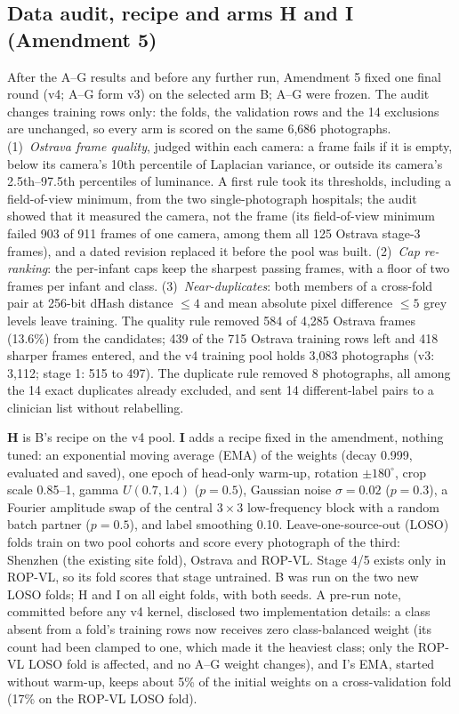 \documentclass[conference]{IEEEtran}
\begin{document}
\subsection{Data audit, recipe and arms H and I (Amendment 5)}
After the A--G results and before any further run, Amendment 5 fixed one final round (v4; A--G form v3) on the selected arm B; A--G were frozen. The audit changes training rows only: the folds, the validation rows and the 14 exclusions are unchanged, so every arm is scored on the same 6{,}686 photographs. (1)~\emph{Ostrava frame quality}, judged within each camera: a frame fails if it is empty, below its camera's 10th percentile of Laplacian variance, or outside its camera's 2.5th--97.5th percentiles of luminance. A first rule took its thresholds, including a field-of-view minimum, from the two single-photograph hospitals; the audit showed that it measured the camera, not the frame (its field-of-view minimum failed 903 of 911 frames of one camera, among them all 125 Ostrava stage-3 frames), and a dated revision replaced it before the pool was built. (2)~\emph{Cap re-ranking}: the per-infant caps keep the sharpest passing frames, with a floor of two frames per infant and class. (3)~\emph{Near-duplicates}: both members of a cross-fold pair at 256-bit dHash distance $\le4$ and mean absolute pixel difference $\le5$ grey levels leave training. The quality rule removed 584 of 4{,}285 Ostrava frames (13.6\%) from the candidates; 439 of the 715 Ostrava training rows left and 418 sharper frames entered, and the v4 training pool holds 3{,}083 photographs (v3: 3{,}112; stage 1: 515 to 497). The duplicate rule removed 8 photographs, all among the 14 exact duplicates already excluded, and sent 14 different-label pairs to a clinician list without relabelling.

\textbf{H} is B's recipe on the v4 pool. \textbf{I} adds a recipe fixed in the amendment, nothing tuned: an exponential moving average (EMA) of the weights (decay 0.999, evaluated and saved), one epoch of head-only warm-up, rotation $\pm180^\circ$, crop scale 0.85--1, gamma $U(0.7,1.4)$ ($p=0.5$), Gaussian noise $\sigma=0.02$ ($p=0.3$), a Fourier amplitude swap of the central $3\times3$ low-frequency block with a random batch partner ($p=0.5$), and label smoothing 0.10. Leave-one-source-out (LOSO) folds train on two pool cohorts and score every photograph of the third: Shenzhen (the existing site fold), Ostrava and ROP-VL. Stage 4/5 exists only in ROP-VL, so its fold scores that stage untrained. B was run on the two new LOSO folds; H and I on all eight folds, with both seeds. A pre-run note, committed before any v4 kernel, disclosed two implementation details: a class absent from a fold's training rows now receives zero class-balanced weight (its count had been clamped to one, which made it the heaviest class; only the ROP-VL LOSO fold is affected, and no A--G weight changes), and I's EMA, started without warm-up, keeps about 5\% of the initial weights on a cross-validation fold (17\% on the ROP-VL LOSO fold).
\end{document}
